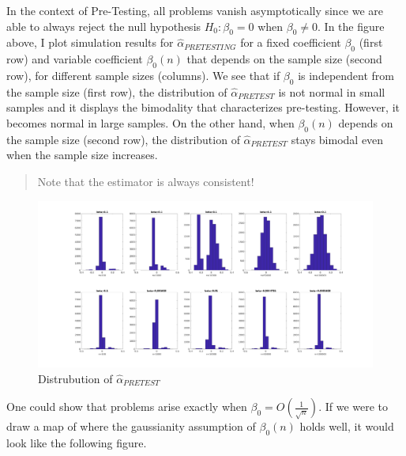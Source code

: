 \documentclass[12pt,]{book}
\begin{document}
In the context of Pre-Testing, all problems vanish asymptotically since we are able to always reject the null hypothesis \(H_0 : \beta_0 = 0\) when \(\beta_0 \neq 0\). In the figure above, I plot simulation results for \(\hat \alpha_{PRETESTING}\) for a fixed coefficient \(\beta_0\) (first row) and variable coefficient \(\beta_0(n)\) that depends on the sample size (second row), for different sample sizes (columns). We see that if \(\beta_0\) is independent from the sample size (first row), the distribution of \(\hat \alpha_{PRETEST}\) is not normal in small samples and it displays the bimodality that characterizes pre-testing. However, it becomes normal in large samples. On the other hand, when \(\beta_0(n)\) depends on the sample size (second row), the distribution of \(\hat \alpha_{PRETEST}\) stays bimodal even when the sample size increases.

\begin{quote}
Note that the estimator is always consistent!
\end{quote}

\begin{figure}
\centering
\includegraphics{figures/Fig_624.png}
\caption{Distrubution of \(\hat \alpha_{PRETEST}\)}
\end{figure}

One could show that problems arise exactly when \(\beta_0 = O \left( \frac{1}{\sqrt{n}} \right)\). If we were to draw a map of where the gaussianity assumption of \(\beta_0(n)\) holds well, it would look like the following figure.
\end{document}
